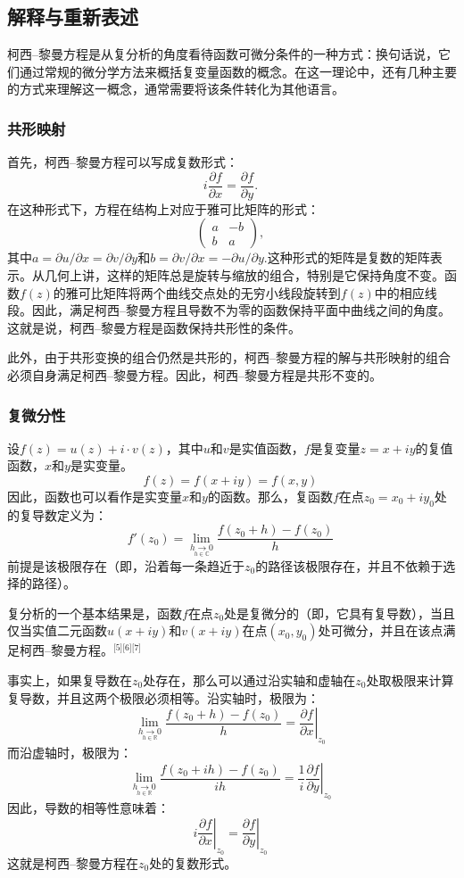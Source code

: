 \subsection{解释与重新表述}  
柯西–黎曼方程是从复分析的角度看待函数可微分条件的一种方式：换句话说，它们通过常规的微分学方法来概括复变量函数的概念。在这一理论中，还有几种主要的方式来理解这一概念，通常需要将该条件转化为其他语言。
\subsubsection{共形映射}   
首先，柯西–黎曼方程可以写成复数形式：
\[
i \frac{\partial f}{\partial x} = \frac{\partial f}{\partial y}.~
\]
在这种形式下，方程在结构上对应于雅可比矩阵的形式：
\[
\begin{pmatrix} a & -b \\ b & a \end{pmatrix},~
\]
其中\(a=\partial u/\partial x=\partial v/\partial y\)和\(b=\partial v/\partial x=-\partial u/\partial y\).这种形式的矩阵是复数的矩阵表示。从几何上讲，这样的矩阵总是旋转与缩放的组合，特别是它保持角度不变。函数\(f(z)\)的雅可比矩阵将两个曲线交点处的无穷小线段旋转到\(f(z)\)中的相应线段。因此，满足柯西–黎曼方程且导数不为零的函数保持平面中曲线之间的角度。这就是说，柯西–黎曼方程是函数保持共形性的条件。

此外，由于共形变换的组合仍然是共形的，柯西–黎曼方程的解与共形映射的组合必须自身满足柯西–黎曼方程。因此，柯西–黎曼方程是共形不变的。
\subsubsection{复微分性}  
设\( f(z) = u(z) + i \cdot v(z) \)，其中\( u \)和\( v \)是实值函数，\( f \)是复变量\( z = x + iy \)的复值函数，\(x\)和\(y\)是实变量。
\[f(z) = f(x + iy) = f(x, y)~\]
因此，函数也可以看作是实变量\(x\)和\(y\)的函数。那么，复函数\(f\)在点\( z_0 = x_0 + iy_0 \)处的复导数定义为：
\[
f'(z_0) = \lim_{\underset{h \in \mathbb{C}}{h \to 0}} \frac{f(z_0 + h) - f(z_0)}{h}~
\]
前提是该极限存在（即，沿着每一条趋近于\( z_0 \)的路径该极限存在，并且不依赖于选择的路径）。

复分析的一个基本结果是，函数\( f \)在点\( z_0 \)处是复微分的（即，它具有复导数），当且仅当实值二元函数\( u(x + iy) \)和\( v(x + iy) \)在点\( (x_0, y_0) \)处可微分，并且在该点满足柯西–黎曼方程。\(^\text{[5][6][7]}\)

事实上，如果复导数在\( z_0 \)处存在，那么可以通过沿实轴和虚轴在\( z_0 \)处取极限来计算复导数，并且这两个极限必须相等。沿实轴时，极限为：
\[
\lim_{\underset{h \in \mathbb{R}}{h \to 0}} \frac{f(z_0 + h) - f(z_0)}{h} = \left. \frac{\partial f}{\partial x} \right|_{z_0}~
\]
而沿虚轴时，极限为：
\[
\lim_{\underset{h \in \mathbb{R}}{h \to 0}} \frac{f(z_0 + ih) - f(z_0)}{ih} = \left. \frac{1}{i} \frac{\partial f}{\partial y} \right|_{z_0}~
\]
因此，导数的相等性意味着：
\[
i \left. \frac{\partial f}{\partial x} \right|_{z_0} = \left. \frac{\partial f}{\partial y} \right|_{z_0}~
\]
这就是柯西–黎曼方程在\( z_0 \)处的复数形式。
